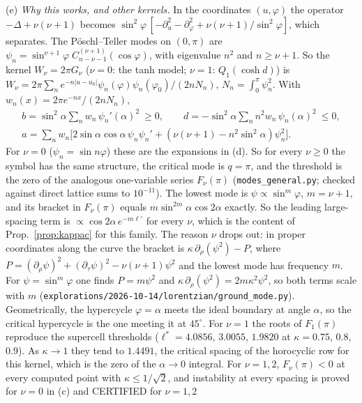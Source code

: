 \documentclass[11pt]{article}
\theoremstyle{remark}
\begin{document}
(e) \emph{Why this works, and other kernels.} In the coordinates $(u,\varphi)$ the operator $-\Delta+\nu(\nu+1)$ becomes
$\sin^2\!\varphi\,[-\partial_u^2-\partial_\varphi^2+\nu(\nu+1)/\sin^2\!\varphi]$, which separates. The P\"oschl--Teller modes on
$(0,\pi)$ are $\psi_n=\sin^{\nu+1}\!\varphi\;C^{(\nu+1)}_{n-\nu-1}(\cos\varphi)$, with eigenvalue $n^2$ and $n\ge\nu+1$. So the kernel
$W_\nu=2\pi G_\nu$ ($\nu=0$: the tanh model; $\nu=1$: $Q_1(\cosh d)$) is
$W_\nu=2\pi\sum_n e^{-n|u-u_0|}\psi_n(\varphi)\psi_n(\varphi_0)/(2nN_n)$, $N_n=\int_0^\pi\psi_n^2$. With $w_n(x)=2\pi e^{-nx}/(2nN_n)$,
\begin{gather*}
b=\sin^2\!\alpha\sum_n w_n\,\psi_n'(\alpha)^2\ \ge0,\qquad d=-\sin^2\!\alpha\sum_n n^2w_n\,\psi_n(\alpha)^2\ \le0,\\
a=\sum_n w_n\big[2\sin\alpha\cos\alpha\,\psi_n\psi_n'+(\nu(\nu+1)-n^2\sin^2\!\alpha)\psi_n^2\big].
\end{gather*}
For $\nu=0$ ($\psi_n=\sin n\varphi$) these are the expansions in (d). So for every $\nu\ge0$ the symbol has the same structure, the
critical mode is $q=\pi$, and the threshold is the zero of the analogous one-variable series $F_\nu(\pi)$
(\texttt{modes\_general.py}; checked against direct lattice sums to $10^{-11}$). The lowest mode is $\psi\propto\sin^m\!\varphi$,
$m=\nu+1$, and its bracket in $F_\nu(\pi)$ equals $m\sin^{2m}\!\alpha\cos2\alpha$ exactly. So the leading large-spacing term is
$\propto\cos2\alpha\,e^{-m\ell'}$ for every $\nu$, which is the content of Prop.~\ref{prop:kappac} for this family. The reason $\nu$ drops out: in proper coordinates along the curve the bracket is $\kappa\,\partial_\rho(\psi^2)-P$, where
$P=(\partial_\rho\psi)^2+(\partial_\tau\psi)^2-\nu(\nu+1)\psi^2$ and the lowest mode has frequency $m$. For $\psi=\sin^m\!\varphi$ one finds
$P=m\psi^2$ and $\kappa\,\partial_\rho(\psi^2)=2m\kappa^2\psi^2$, so both terms scale with $m$
(\texttt{explorations/2026-10-14/lorentzian/ground\_mode.py}). Geometrically,
the hypercycle $\varphi=\alpha$ meets the ideal boundary at angle $\alpha$, so the critical hypercycle is the one meeting it at
$45^\circ$. For $\nu=1$ the roots of $F_1(\pi)$ reproduce the supercell thresholds ($\ell^*=4.0856$, $3.0055$, $1.9820$ at
$\kappa=0.75$, $0.8$, $0.9$). As $\kappa\to1$ they tend to $1.4491$, the critical spacing of the horocyclic row for this
kernel, which is the zero of the $\alpha\to0$ integral. For $\nu=1,2$, $F_\nu(\pi)<0$ at every computed point with
$\kappa\le1/\sqrt2$, and instability at every spacing is proved for $\nu=0$ in (c) and CERTIFIED for $\nu=1,2$
\end{document}
